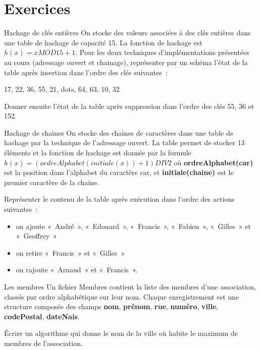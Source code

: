 \section{Exercices}

	\begin{Exercice}{Hachage de clés entières}
		On stocke des valeurs associées à des clés entières 
		dans une table de hachage de capacité 15.
		La fonction de hachage est $h(x) = x MOD 15 + 1$. 
		Pour les deux techniques d'implémentations présentées 
		au cours (adressage ouvert et chainage), représenter 
		par un schéma l'état de la table
		après insertion dans l'ordre des clés suivantes~: 

		{\centering
		{17, 22, 36, 55, 21, {dots}, 64, 63, 10, 32}
		\par}

		Donner ensuite l'état de la table après suppression
		dans l'ordre des clés 55, 36 et 152.

	\end{Exercice}
	
	\begin{Exercice}{Hachage de chaines}
		On stocke des chaines de caractères dans une table de hachage 
		par la technique de l'adressage ouvert. La table permet de
		stocker 13 éléments et la fonction de hachage est donnée 
		par la formule $h(x) = 	(ordreAlphabet(initiale(\textit{x})) + 1) DIV 2$ 
		où \textbf{ordreAlphabet(car)} est la position dans l'alphabet du caractère car,
		et \textbf{initiale(chaine)} est le premier caractère de la chaine.
		
		Représenter le contenu de la table après exécution 
		dans l'ordre des actions suivantes~:

		\begin{itemize}
			\item {
				on ajoute «~André~», «~Edouard~», «~Francis~», «~Fabien~», «~Gilles~» et «~Geoffrey~»}
			\item {
				on retire «~Francis~» et «~Gilles~» }
			\item {
				on rajoute «~Arnaud~» et «~Francis~».}
		\end{itemize}

	\end{Exercice}
	
	\begin{Exercice}{Les membres}
		Un fichier Membres contient la liste des membres d'une association, 
		classés par ordre alphabétique sur leur nom. Chaque enregistrement est une 
		structure composée des champs \textbf{nom}, \textbf{prénom}, \textbf{rue}, 
		\textbf{numéro}, \textbf{ville}, \textbf{codePostal}, \textbf{dateNais}.

		Écrire un algorithme qui donne le nom de la ville 
		où habite le maximum de membres de l'association.

	\end{Exercice}
	
